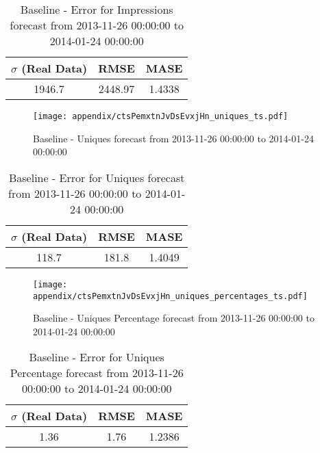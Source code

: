 \begin{table}[H]
\centering
\footnotesize
\begin{tabular}{ccc}
$\sigma$ (Real Data) & RMSE & MASE   \\ \hline
1946.7 & 2448.97 & 1.4338 \\
\end{tabular}

\vspace{0.5cm}

\caption[]{
Baseline - Error for Impressions forecast from 2013-11-26 00:00:00 to 2014-01-24 00:00:00}
\end{table}

\begin{figure}[H] \begin{center} \leavevmode
\texttt{[image: appendix/ctsPemxtnJvDsEvxjHn\_uniques\_ts.pdf]} \caption[]{
Baseline - Uniques forecast from 2013-11-26 00:00:00 to 2014-01-24 00:00:00} \label{fig:appendix/ctsPemxtnJvDsEvxjHn_uniques_ts.pdf} \end{center}
\end{figure}

\begin{table}[H]
\centering
\footnotesize
\begin{tabular}{ccc}
$\sigma$ (Real Data) & RMSE & MASE   \\ \hline
118.7 & 181.8 & 1.4049 \\
\end{tabular}

\vspace{0.5cm}

\caption[]{
Baseline - Error for Uniques forecast from 2013-11-26 00:00:00 to 2014-01-24 00:00:00}
\end{table}

\begin{figure}[H] \begin{center} \leavevmode
\texttt{[image: appendix/ctsPemxtnJvDsEvxjHn\_uniques\_percentages\_ts.pdf]} \caption[]{
Baseline - Uniques Percentage forecast from 2013-11-26 00:00:00 to 2014-01-24 00:00:00} \label{fig:appendix/ctsPemxtnJvDsEvxjHn_uniques_percentages_ts.pdf} \end{center}
\end{figure}

\begin{table}[H]
\centering
\footnotesize
\begin{tabular}{ccc}
$\sigma$ (Real Data) & RMSE & MASE   \\ \hline
1.36 & 1.76 & 1.2386 \\
\end{tabular}

\vspace{0.5cm}

\caption[]{
Baseline - Error for Uniques Percentage forecast from 2013-11-26 00:00:00 to 2014-01-24 00:00:00}
\end{table}


